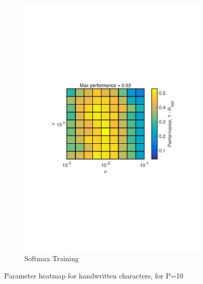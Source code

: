 \documentclass[journal,a4paper,onecolumn,11pt]{IEEEtran}
\begin{document}
\begin{figure}[!h]
\begin{subfigure}{.5\textwidth}
		\includegraphics[width=\textwidth]{para_opt_hwchar_sm.pdf}
		\caption{Softmax Training}
		\label{fig:para_opt_hwchar_sm}
	\end{subfigure}%
	\caption{Parameter heatmap for handwritten characters, for P=10}
	\label{fig:heatmap_handwrittenchar}
\end{figure}
\end{document}
